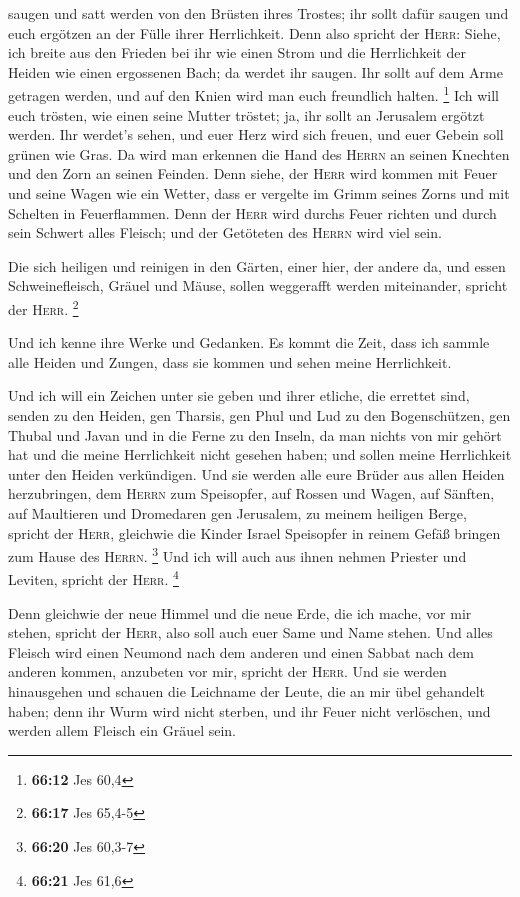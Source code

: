 saugen und satt werden von den Brüsten ihres Trostes; ihr sollt dafür
saugen und euch ergötzen an der Fülle ihrer Herrlichkeit.
 Denn also spricht der \textsc{Herr}: Siehe, ich breite
aus den Frieden bei ihr wie einen Strom und die Herrlichkeit der Heiden
wie einen ergossenen Bach; da werdet ihr saugen. Ihr sollt auf dem Arme
getragen werden, und auf den Knien wird man euch freundlich halten.
\footnote{\textbf{66:12} Jes 60,4}  Ich will euch
trösten, wie einen seine Mutter tröstet; ja, ihr sollt an Jerusalem
ergötzt werden.  Ihr werdet's sehen, und euer Herz wird
sich freuen, und euer Gebein soll grünen wie Gras. Da wird man erkennen
die Hand des \textsc{Herrn} an seinen Knechten und den Zorn an seinen
Feinden.  Denn siehe, der \textsc{Herr} wird kommen mit
Feuer und seine Wagen wie ein Wetter, dass er vergelte im Grimm seines
Zorns und mit Schelten in Feuerflammen.  Denn der
\textsc{Herr} wird durchs Feuer richten und durch sein Schwert alles
Fleisch; und der Getöteten des \textsc{Herrn} wird viel sein.

 Die sich heiligen und reinigen in den Gärten, einer
hier, der andere da, und essen Schweinefleisch, Gräuel und Mäuse, sollen
weggerafft werden miteinander, spricht der \textsc{Herr}. \footnote{\textbf{66:17}
  Jes 65,4-5}

 Und ich kenne ihre Werke und Gedanken. Es kommt die
Zeit, dass ich sammle alle Heiden und Zungen, dass sie kommen und sehen
meine Herrlichkeit.

 Und ich will ein Zeichen unter sie geben und ihrer
etliche, die errettet sind, senden zu den Heiden, gen Tharsis, gen Phul
und Lud zu den Bogenschützen, gen Thubal und Javan und in die Ferne zu
den Inseln, da man nichts von mir gehört hat und die meine Herrlichkeit
nicht gesehen haben; und sollen meine Herrlichkeit unter den Heiden
verkündigen.  Und sie werden alle eure Brüder aus allen
Heiden herzubringen, dem \textsc{Herrn} zum Speisopfer, auf Rossen und
Wagen, auf Sänften, auf Maultieren und Dromedaren gen Jerusalem, zu
meinem heiligen Berge, spricht der \textsc{Herr}, gleichwie die Kinder
Israel Speisopfer in reinem Gefäß bringen zum Hause des \textsc{Herrn}.
\footnote{\textbf{66:20} Jes 60,3-7}  Und ich will auch
aus ihnen nehmen Priester und Leviten, spricht der \textsc{Herr}.
\footnote{\textbf{66:21} Jes 61,6}

 Denn gleichwie der neue Himmel und die neue Erde, die
ich mache, vor mir stehen, spricht der \textsc{Herr}, also soll auch
euer Same und Name stehen.  Und alles Fleisch wird einen
Neumond nach dem anderen und einen Sabbat nach dem anderen kommen,
anzubeten vor mir, spricht der \textsc{Herr}.  Und sie
werden hinausgehen und schauen die Leichname der Leute, die an mir übel
gehandelt haben; denn ihr Wurm wird nicht sterben, und ihr Feuer nicht
verlöschen, und werden allem Fleisch ein Gräuel sein.
